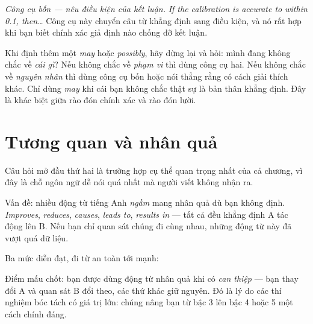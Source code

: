 \documentclass[../../english.tex]{subfiles}
\begin{document}
\emph{Công cụ bốn --- nêu điều kiện của kết luận.} \emph{If the calibration is accurate to within 0.1\textdegree, then\ldots} Công cụ này chuyển câu từ khẳng định sang điều kiện, và nó rất hợp khi bạn biết chính xác giả định nào chống đỡ kết luận.

\begin{cannho}
Khi định thêm một \emph{may} hoặc \emph{possibly}, hãy dừng lại và hỏi: mình đang không chắc về \emph{cái gì}? Nếu không chắc về \emph{phạm vi} thì dùng công cụ hai. Nếu không chắc về \emph{nguyên nhân} thì dùng công cụ bốn hoặc nói thẳng rằng có cách giải thích khác. Chỉ dùng \emph{may} khi cái bạn không chắc thật sự là bản thân khẳng định. Đây là khác biệt giữa rào đón chính xác và rào đón lười.
\end{cannho}

\section{Tương quan và nhân quả}

Câu hỏi mở đầu thứ hai là trường hợp cụ thể quan trọng nhất của cả chương, vì đây là chỗ ngôn ngữ dễ nói quá nhất mà người viết không nhận ra.

Vấn đề: nhiều động từ tiếng Anh \emph{ngầm} mang nhân quả dù bạn không định. \emph{Improves}, \emph{reduces}, \emph{causes}, \emph{leads to}, \emph{results in} --- tất cả đều khẳng định A tác động lên B. Nếu bạn chỉ quan sát chúng đi cùng nhau, những động từ này đã vượt quá dữ liệu.

Ba mức diễn đạt, đi từ an toàn tới mạnh:

\begin{mauau}
\end{mauau}

Điểm mấu chốt: bạn được dùng động từ nhân quả khi có \emph{can thiệp} --- bạn thay đổi A và quan sát B đổi theo, các thứ khác giữ nguyên. Đó là lý do các thí nghiệm bóc tách có giá trị lớn: chúng nâng bạn từ bậc 3 lên bậc 4 hoặc 5 một cách chính đáng.
\end{document}
